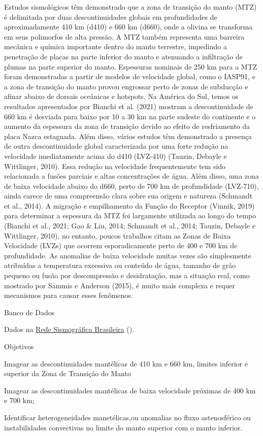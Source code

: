 \documentclass[10pt,a4paper,oneside]{book}
\begin{document}
Estudos sismológicos têm demonstrado que a zona de transição do manto (MTZ) é delimitada por duas descontinuidades globais em profundidades de aproximadamente 410 km (d410) e 660 km (d660), onde a olivina se transforma em seus polimorfos de alta pressão. A MTZ também representa uma barreira mecânica e química importante dentro do manto terrestre, impedindo a penetração de placas na parte inferior do manto e atenuando a infiltração de plumas na parte superior do manto. Espessuras nominais de 250 km para a MTZ foram demonstradas a partir de modelos de velocidade global, como o IASP91, e a zona de transição do manto provou engrossar perto de zonas de subducção e afinar abaixo de dorsais oceânicas e hotspots. Na América do Sul, temos os resultados apresentados por Bianchi et al. (2021) mostram a descontinuidade de 660 km é desviada para baixo por 10 a 30 km na parte sudeste do continente e o aumento da espessura da zona de transição devido ao efeito de resfriamento da placa Nazca estagnada. Além disso, vários estudos têm demonstrado a presença de outra descontinuidade global caracterizada por uma forte redução na velocidade imediatamente acima do d410 (LVZ-410) (Tauzin, Debayle e Wittlinger, 2010). Essa redução na velocidade frequentemente tem sido relacionada a fusões parciais e altas concentrações de água. Além disso, uma zona de baixa velocidade abaixo do d660, perto de 700 km de profundidade (LVZ-710), ainda carece de uma compreensão clara sobre sua origem e natureza (Schmandt et al., 2014). A migração e empilhamento da Função do Receptor (Vinnik, 2019) para determinar a espessura da MTZ foi largamente utilizada ao longo do tempo (Bianchi et al., 2021; Gao \& Liu, 2014; Schmandt et al., 2014; Tauzin, Debayle e Wittlinger, 2010), no entanto, poucos trabalhos citam as Zonas de Baixa Velocidade (LVZs) que ocorrem esporadicamente perto de 400 e 700 km de profundidade. As anomalias de baixa velocidade muitas vezes são simplesmente atribuídas a temperatura excessiva ou conteúdo de água, tamanho de grão pequeno ou fusão por descompressão e desidratação, mas a situação real, como mostrado por Sammis e Anderson (2015), é muito mais complexa e requer mecanismos para causar esses fenômenos.

\begin{fancyenum}{\faDatabase}{Banco de Dados}
	\item Dados na \href{http://rsbr.on.br/}{Rede Sismográfica Brasileira} (\faUnlock).
\end{fancyenum}

\begin{fancyenum}{\faFutbol}{Objetivos}
	\item Imagear as descontinuidades mantélicas de 410 km e 660 km, limites inferior e superior da Zona de Transição do Manto
	\item Imagear as descontinuidades mantélicas de baixa velocidade próximas de 400 km e 700 km;
	\item Identificar heterogeneidades manetélicas,ou anomalias no fluxo astenosférico ou instabilidades convectivas no limite do manto superior com o manto inferior.
\end{fancyenum}
\end{document}
